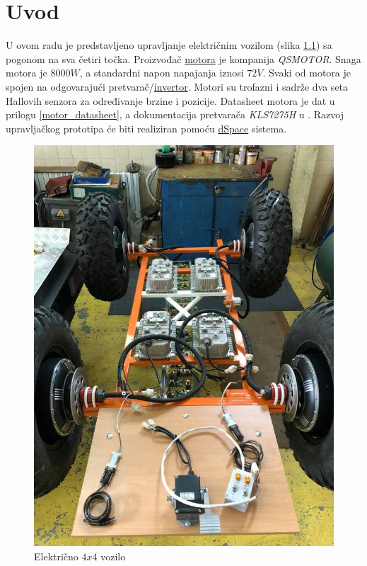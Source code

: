 \chapter{Uvod}

\qquad U ovom radu je predstavljeno upravljanje električnim vozilom (slika \ref{fig:buggy}) sa pogonom na sva četiri točka. Proizvođač \href{https://www.qsmotor.com/product/8000w-car-motor/}{motora} je kompanija \textit{QSMOTOR}. Snaga motora je $8000W$, a standardni napon napajanja iznosi $72V$. Svaki od motora je spojen na odgovarajući pretvarač/\href{https://kellycontroller.com/shop/kls-h/}{invertor}. Motori su trofazni i sadrže dva seta Hallovih senzora za određivanje brzine i pozicije. Datasheet motora je dat u prilogu \ref{motor_datasheet}, a dokumentacija pretvarača \textit{KLS7275H} u \cite{kls7275h}. Razvoj upravljačkog prototipa će biti realiziran pomoću \href{https://www.dspace.com/en/inc/home/products/hw/microlabbox.cfm?fbclid=IwAR08_hHwsXPVRs6ng2DLSU5HA3vDNzpBa9CMpO8DWlSQ1DXPK58BkLmoiRE}{dSpace} sistema.

\begin{figure}
\begin{center}
\includegraphics[scale=0.5]{slike/electric_car.jpg}
\end{center}
\caption{Električno $4x4$ vozilo}
\label{fig:buggy}
\end{figure}

